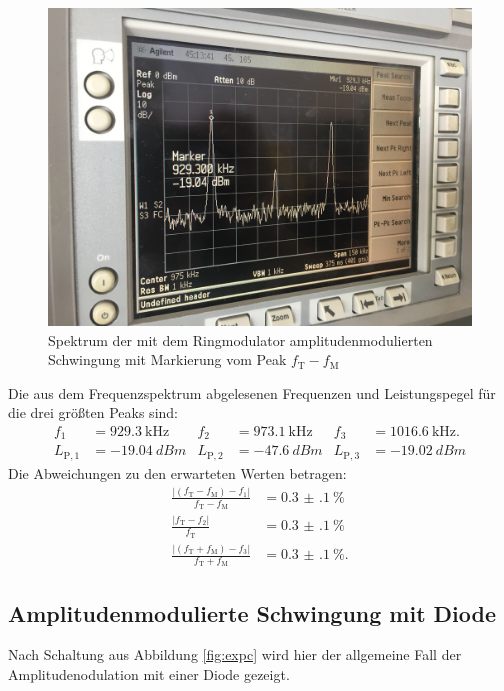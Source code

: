 \begin{figure}[h]
  \includegraphics[width=.9\textwidth]{Spektrum_Pics/b1.jpg}
  \caption{Spektrum der mit dem Ringmodulator amplitudenmodulierten Schwingung mit Markierung vom Peak $f_\text{T} - f_\text{M}$}
  \label{fig:b1}
\end{figure}


Die aus dem Frequenzspektrum abgelesenen Frequenzen und Leistungspegel für die drei größten Peaks sind:
\begin{align*}
  f_1 &= \SI{929.3}{\kilo\hertz} & f_2 &= \SI{973.1}{\kilo\hertz} & f_3 &= \SI{1016.6}{\kilo\hertz}.\\
  L_{\text{P}, 1} &= \SI{-19.04}{dBm} & L_{\text{P}, 2} &= \SI{-47.6}{dBm} & L_{\text{P}, 3} &= \SI{-19.02}{dBm}
\end{align*}
Die Abweichungen zu den erwarteten Werten betragen:
\begin{align*}
  \frac{|(f_\text{T} - f_\text{M}) - f_1|}{f_\text{T} - f_\text{M}} &= \SI{0.3(1)}{\percent}\\
  \frac{|f_\text{T} - f_2|}{f_\text{T}} &= \SI{0.3(1)}{\percent}\\
  \frac{|(f_\text{T} + f_\text{M}) - f_3|}{f_\text{T} + f_\text{M}} &= \SI{0.3(1)}{\percent}.
\end{align*}

\subsection{Amplitudenmodulierte Schwingung mit Diode}

Nach Schaltung aus Abbildung \ref{fig:expc} wird hier der allgemeine Fall der Amplitudenodulation mit einer Diode gezeigt.

